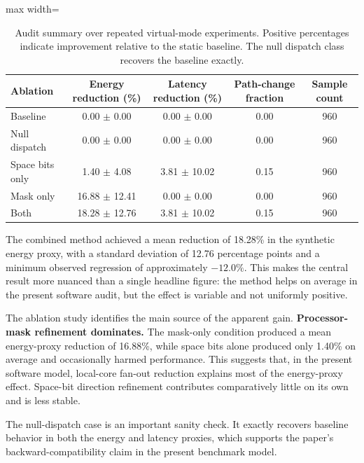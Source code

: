 \documentclass[11pt]{article}
\begin{document}
\begin{table}[t]
\centering
\caption{Audit summary over repeated virtual-mode experiments. Positive percentages indicate improvement relative to the static baseline. The null dispatch class recovers the baseline exactly.}
\label{tab:audit-summary}
\begin{adjustbox}{max width=\linewidth}
\begin{tabular}{>{\raggedright\arraybackslash}p{2.8cm}cccc}
\toprule
Ablation & Energy reduction (\%) & Latency reduction (\%) & Path-change fraction & Sample count \\
\midrule
Baseline & 0.00 $\pm$ 0.00 & 0.00 $\pm$ 0.00 & 0.00 & 960 \\
Null dispatch & 0.00 $\pm$ 0.00 & 0.00 $\pm$ 0.00 & 0.00 & 960 \\
Space bits only & 1.40 $\pm$ 4.08 & 3.81 $\pm$ 10.02 & 0.15 & 960 \\
Mask only & 16.88 $\pm$ 12.41 & 0.00 $\pm$ 0.00 & 0.00 & 960 \\
Both & 18.28 $\pm$ 12.76 & 3.81 $\pm$ 10.02 & 0.15 & 960 \\
\bottomrule
\end{tabular}
\end{adjustbox}
\end{table}

The combined method achieved a mean reduction of 18.28\% in the synthetic energy proxy, with a standard deviation of 12.76 percentage points and a minimum observed regression of approximately $-12.0\%$. This makes the central result more nuanced than a single headline figure: the method helps on average in the present software audit, but the effect is variable and not uniformly positive.

The ablation study identifies the main source of the apparent gain. \textbf{Processor-mask refinement dominates.} The mask-only condition produced a mean energy-proxy reduction of 16.88\%, while space bits alone produced only 1.40\% on average and occasionally harmed performance. This suggests that, in the present software model, local-core fan-out reduction explains most of the energy-proxy effect. Space-bit direction refinement contributes comparatively little on its own and is less stable.

The null-dispatch case is an important sanity check. It exactly recovers baseline behavior in both the energy and latency proxies, which supports the paper's backward-compatibility claim in the present benchmark model.
\end{document}

